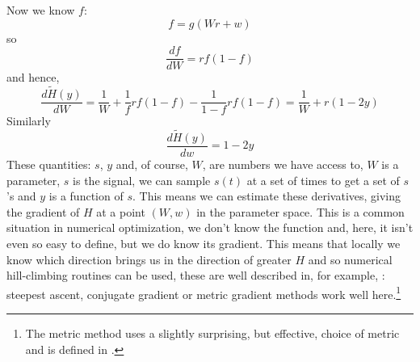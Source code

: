 \documentclass[12pt]{article}
\begin{document}
Now we know $f$:
\begin{equation}
f=g(Wr+w)
\end{equation}
so
\begin{equation}
\frac{df}{dW}=rf(1-f)
\end{equation}
and hence, 
\begin{equation}
\frac{d\tilde{H}(y)}{dW}=\frac{1}{W}+\frac{1}{f}rf(1-f)-\frac{1}{1-f}rf(1-f)=\frac{1}{W}+r(1-2y)
\end{equation}
Similarly
\begin{equation}
\frac{d\tilde{H}(y)}{dw}=1-2y
\end{equation}
These quantities: $s$, $y$ and, of course, $W$, are numbers we have
access to, $W$ is a parameter, $s$ is the signal, we can sample $s(t)$
at a set of times to get a set of $s$'s and $y$ is a function of
$s$. This means we can estimate these derivatives, giving the gradient
of $H$ at a point $(W,w)$ in the parameter space. This is a common
situation in numerical optimization, we don't know the function and,
here, it isn't even so easy to define, but we do know its
gradient. This means that locally we know which direction brings us in
the direction of greater $H$ and so numerical hill-climbing routines
can be used, these are well described in, for example,
\cite{PressEtAl2007}: steepest ascent, conjugate gradient or metric
gradient methods work well here.\footnote{The metric method uses a
  slightly surprising, but effective, choice of metric and is defined in \cite{Amari1998}.}
\end{document}
